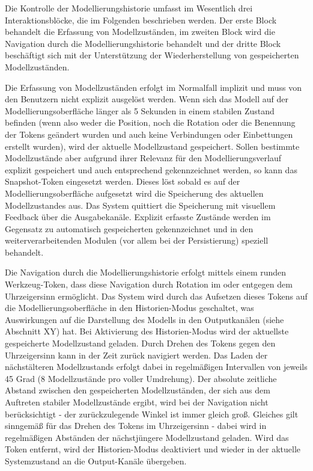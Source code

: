 Die Kontrolle der Modellierungshistorie umfasst im Wesentlich drei Interaktionsblöcke, die im Folgenden beschrieben werden. Der erste Block behandelt die Erfassung von Modellzuständen, im zweiten Block wird die Navigation durch die Modellierungshistorie behandelt und der dritte Block beschäftigt sich mit der Unterstützung der Wiederherstellung von gespeicherten Modellzuständen.

Die Erfassung von Modellzuständen erfolgt im Normalfall implizit und muss von den Benutzern nicht explizit ausgelöst werden. Wenn sich das Modell auf der Modellierungsoberfläche länger als 5 Sekunden in einem stabilen Zustand befinden (wenn also weder die Position, noch die Rotation oder die Benennung der Tokens geändert wurden und auch keine Verbindungen oder Einbettungen erstellt wurden), wird der aktuelle Modellzustand gespeichert. Sollen bestimmte Modellzustände aber aufgrund ihrer Relevanz für den Modellierungsverlauf explizit gespeichert und auch entsprechend gekennzeichnet werden, so kann das Snapshot-Token eingesetzt werden. Dieses löst sobald es auf der Modellierungsoberfläche aufgesetzt wird die Speicherung des aktuellen Modellzustandes aus. Das System quittiert die Speicherung mit visuellem Feedback über die Ausgabekanäle. Explizit erfasste Zustände werden im Gegensatz zu automatisch gespeicherten gekennzeichnet und in den weiterverarbeitenden Modulen (vor allem bei der Persistierung) speziell behandelt.

Die Navigation durch die Modellierungshistorie erfolgt mittels einem runden Werkzeug-Token, dass diese Navigation durch Rotation im oder entgegen dem Uhrzeigersinn ermöglicht. Das System wird durch das Aufsetzen dieses Tokens auf die Modellierungsoberfläche in den Historien-Modus geschaltet, was Auswirkungen auf die Darstellung des Modells in den Outputkanälen (siehe Abschnitt XY) hat. Bei Aktivierung des Historien-Modus wird der aktuellste gespeicherte Modellzustand geladen. Durch Drehen des Tokens gegen den Uhrzeigersinn kann in der Zeit zurück navigiert werden. Das Laden der nächstälteren Modellzustands erfolgt dabei in regelmäßigen Intervallen von jeweils 45 Grad (8 Modellzustände pro voller Umdrehung). Der absolute zeitliche Abstand zwischen den gespeicherten Modellzuständen, der sich aus dem Auftreten stabiler Modellzustände ergibt, wird bei der Navigation nicht berücksichtigt - der zurückzulegende Winkel ist immer gleich groß. Gleiches gilt sinngemäß für das Drehen des Tokens im Uhrzeigersinn - dabei wird in regelmäßigen Abständen der nächstjüngere Modellzustand geladen. Wird das Token entfernt, wird der Historien-Modus deaktiviert und wieder in der aktuelle Systemzustand an die Output-Kanäle übergeben.

